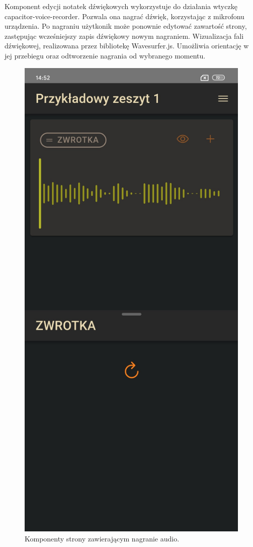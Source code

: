Komponent edycji notatek dźwiękowych wykorzystuje do działania wtyczkę capacitor-voice-recorder. Pozwala ona nagrać
dźwięk, korzystając z mikrofonu urządzenia. Po nagraniu użytkonik może ponownie edytować zawartość strony, zastępując
wcześniejszy zapis dźwiękowy nowym nagraniem. Wizualizacja fali dźwiękowej, realizowana przez bibliotekę Wavesurfer.js.
Umożliwia orientację w jej przebiegu oraz odtworzenie nagrania od wybranego momentu.

\begin{figure}[H]
	\begin{center}
		\includegraphics[scale=0.2]{media/AudioPage.jpg}
	\end{center}
	\caption{Komponenty strony zawierającym nagranie audio.}
	\label{rys:audio-page}
\end{figure}

